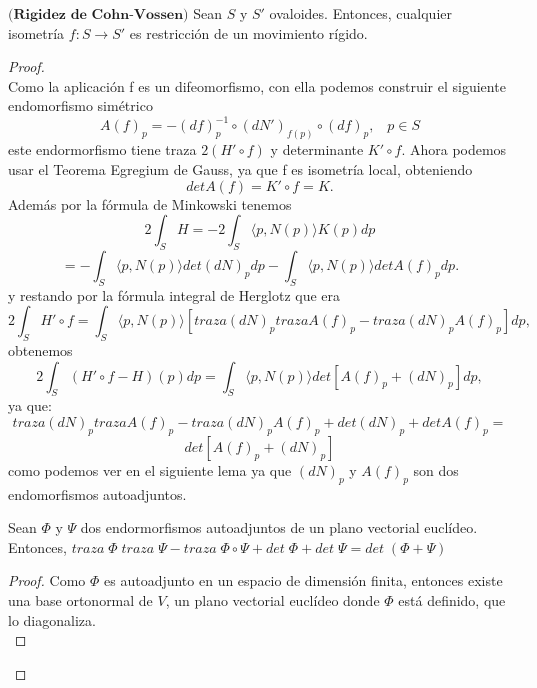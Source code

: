 \begin{teorema} \label{teo:cohn}
	$\textbf{(Rigidez de Cohn-Vossen)}$ Sean $S$ y $S'$ ovaloides. Entonces, cualquier isometría $f : S \to S'$ es restricción de un movimiento rígido.
\end{teorema}

\begin{proof}
	${ }$\\
	
	Como la aplicación f es un difeomorfismo, con ella podemos construir el siguiente endomorfismo simétrico
	${ }$\\
	\[
		A(f)_p = -(df)^{-1}_{p} \circ (dN')_{f(p)} \circ (df)_p, \;\;\; p \in S
	\]
	${ }$\\
	este endormorfismo tiene traza $2(H' \circ f)$ y determinante $K' \circ f$. Ahora podemos usar el Teorema Egregium de Gauss, ya que f es isometría local, obteniendo
	${ }$\\
	\[
		det A(f) = K' \circ f = K.
	\]
	${ }$\\
	Además por la fórmula de Minkowski tenemos
	${ }$\\
	\[
		2 \int_S H = -2 \int_S \langle p, N(p) \rangle K(p) dp
	\]
	\[
		= - \int_S \langle p, N(p) \rangle det(dN)_p dp - \int_S \langle p, N(p) \rangle det A(f)_p dp.
	\]
	${ }$\\
	y restando por la fórmula integral de Herglotz que era
	${ }$\\
	\[
		2 \int_S H' \circ f = \int_S \langle p, N(p) \rangle [traza(dN)_p trazaA(f)_p - traza(dN)_p A(f)_p] dp,
	\]
	${ }$\\
	obtenemos
	${ }$\\
	\[
		2 \int_S (H' \circ f - H)(p) dp = \int_S \langle p, N(p) \rangle det[A(f)_p + (dN)_p] dp,
	\]
	${ }$\\
	ya que:
	${ }$\\
	$$traza(dN)_p trazaA(f)_p - traza(dN)_p A(f)_p + det(dN)_p + det A(f)_p =$$
	$$ det[A(f)_p + (dN)_p] $$
	${ }$\\
	como podemos ver en el siguiente lema ya que $(dN)_p$ y $A(f)_p$ son dos endomorfismos autoadjuntos.
${ }$\\

	\begin{lema}
		Sean $\Phi$ y $\Psi$ dos endormorfismos autoadjuntos de un plano vectorial euclídeo. Entonces, $traza \; \Phi \; traza \; \Psi - traza \; \Phi \circ \Psi + det \; \Phi + det \; \Psi = det \; (\Phi + \Psi)$
	\end{lema}
	
	\begin{proof}
		Como $\Phi$ es autoadjunto en un espacio de dimensión finita, entonces existe una base ortonormal de $V$, un plano vectorial euclídeo donde $\Phi$ está definido, que lo diagonaliza.
		${ }$\\
		

\end{proof}
\end{proof}
